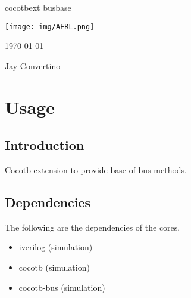 \begin{titlepage}
  \begin{center}

  {\Huge cocotbext busbase}

  \vspace{25mm}

  \texttt{[image: img/AFRL.png]}

  \vspace{25mm}

  \today

  \vspace{15mm}

  {\Large Jay Convertino}

  \end{center}
\end{titlepage}

\tableofcontents

\newpage

\section{Usage}

\subsection{Introduction}

\par
Cocotb extension to provide base of bus methods.

\subsection{Dependencies}

\par
The following are the dependencies of the cores.

\begin{itemize}
  \item iverilog (simulation)
  \item cocotb (simulation)
  \item cocotb-bus (simulation)
\end{itemize}

